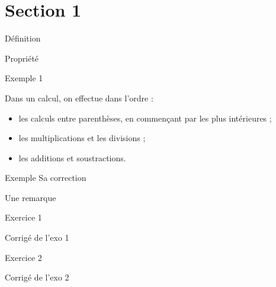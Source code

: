 \documentclass[nocrop]{sesamanuel_college_5e_new}
\begin{document}
\cours 


\section{Section 1}

\begin{definition}
   Définition
\end{definition}

\begin{propriete}
   Propriété
\end{propriete}

\begin{exemple*1}
   Exemple 1
\end{exemple*1}

\begin{methode}
   Dans un calcul, on effectue dans l'ordre :
   \begin{itemize}
      \item les calculs entre parenthèses, en commençant par les plus intérieures ;
      \item les multiplications et les divisions ;
      \item les additions et soustractions.
   \end{itemize}
   \exercice
      Exemple
   \correction
      Sa correction
\end{methode}

\begin{remarque}
   Une remarque
\end{remarque}


\exercicesbase

\begin{colonne*exercice}

\begin{exercice} %
   Exercice 1
\end{exercice}

\begin{corrige}
   Corrigé de l'exo 1
\end{corrige}

\bigskip


\begin{exercice} %
   Exercice 2
\end{exercice}

\begin{corrige}
   Corrigé de l'exo 2
\end{corrige}


\end{colonne*exercice}
\end{document}
